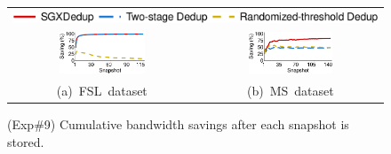 \begin{figure}[t]
\centering
\begin{tabular}{@{\ }c@{\ }c}
\multicolumn{2}{c}{\includegraphics[width=\textwidth]{pic/sgxdedup/upload_traffic_legend.pdf}} \\
\hspace{-0.1in}
\includegraphics[width=0.48\textwidth]{pic/sgxdedup/upload_traffic_fsl.pdf} &
\includegraphics[width=0.48\textwidth]{pic/sgxdedup/upload_traffic_ms.pdf}
\vspace{-3pt}\\ 
\mbox{\small (a) FSL dataset} &
\mbox{\small (b) MS dataset}
\end{tabular}
\vspace{-6pt}
\caption{(Exp\#9) Cumulative bandwidth savings after each snapshot is stored.}
\label{fig:uploadTraffic}
\end{figure}

